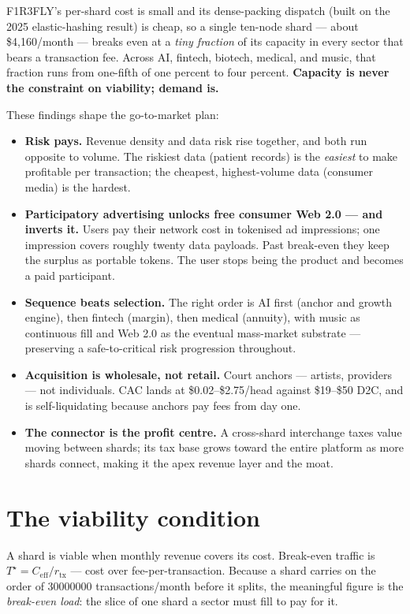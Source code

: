 \documentclass[11pt]{article}
\begin{document}
F1R3FLY's per-shard cost is small and its dense-packing dispatch (built on the 2025 elastic-hashing result) is cheap, so a single ten-node shard --- about \$4,160/month --- breaks even at a \emph{tiny fraction} of its capacity in every sector that bears a transaction fee. Across AI, fintech, biotech, medical, and music, that fraction runs from one-fifth of one percent to four percent. \textbf{Capacity is never the constraint on viability; demand is.}

These findings shape the go-to-market plan:

\begin{itemize}[leftmargin=1.4em, itemsep=3pt]
  \item \textbf{Risk pays.} Revenue density and data risk rise together, and both run opposite to volume. The riskiest data (patient records) is the \emph{easiest} to make profitable per transaction; the cheapest, highest-volume data (consumer media) is the hardest.
  \item \textbf{Participatory advertising unlocks free consumer Web 2.0 --- and inverts it.} Users pay their network cost in tokenised ad impressions; one impression covers roughly twenty data payloads. Past break-even they keep the surplus as portable tokens. The user stops being the product and becomes a paid participant.
  \item \textbf{Sequence beats selection.} The right order is AI first (anchor and growth engine), then fintech (margin), then medical (annuity), with music as continuous fill and Web 2.0 as the eventual mass-market substrate --- preserving a safe-to-critical risk progression throughout.
  \item \textbf{Acquisition is wholesale, not retail.} Court anchors --- artists, providers --- not individuals. CAC lands at \$0.02--\$2.75/head against \$19--\$50 D2C, and is self-liquidating because anchors pay fees from day one.
  \item \textbf{The connector is the profit centre.} A cross-shard interchange taxes value moving between shards; its tax base grows toward the entire platform as more shards connect, making it the apex revenue layer and the moat.
\end{itemize}

\section{The viability condition}

A shard is viable when monthly revenue covers its cost. Break-even traffic is $T^\star = C_{\text{eff}} / r_{\text{tx}}$ --- cost over fee-per-transaction. Because a shard carries on the order of \num{30000000} transactions/month before it splits, the meaningful figure is the \emph{break-even load}: the slice of one shard a sector must fill to pay for it.
\end{document}
